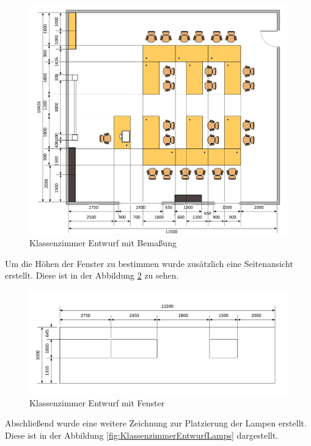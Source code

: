 \begin{figure}[H]
  \centering
  \includegraphics[width=1\textwidth]{images/classroom_draw.pdf}
  \caption{Klassenzimmer Entwurf mit Bemaßung}
  \label{fig:KlassenzimmerEntwurf}
\end{figure}\noindent
Um die Höhen der Fenster zu bestimmen wurde zusätzlich eine Seitenansicht erstellt.
Diese ist in der Abbildung \ref{fig:KlassenzimmerEntwurfWindows} zu sehen.
\begin{figure}[H]
  \centering
  \includegraphics[width=1\textwidth]{images/classroom_draw_windows.pdf}
  \caption{Klassenzimmer Entwurf mit Fenster}
  \label{fig:KlassenzimmerEntwurfWindows}
\end{figure}\noindent
Abschließend wurde eine weitere Zeichnung zur Platzierung der Lampen erstellt. Diese ist in der Abbildung \ref{fig:KlassenzimmerEntwurfLamps}
dargestellt.
